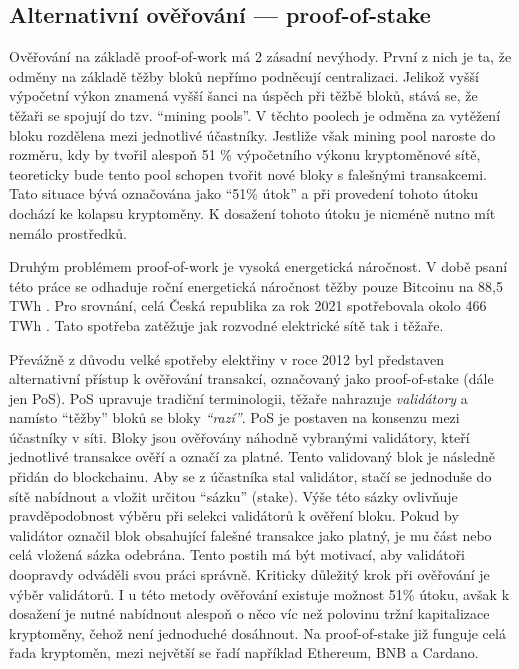 \subsection{Alternativní ověřování --- proof-of-stake}
\label{proof-of-stake-subsection}
Ověřování na základě proof-of-work má 2 zásadní nevýhody. První z nich je ta, že odměny na základě těžby bloků nepřímo podněcují centralizaci.
Jelikož vyšší výpočetní výkon znamená vyšší šanci na úspěch při těžbě bloků, stává se, že těžaři se spojují do tzv. \enquote{mining pools}.
V těchto poolech je odměna za vytěžení bloku rozdělena mezi jednotlivé účastníky. Jestliže však mining pool naroste do rozměru, kdy by tvořil
alespoň 51 \% výpočetního výkonu kryptoměnové sítě, teoreticky bude tento pool schopen tvořit nové bloky s falešnými transakcemi. Tato situace
bývá označována jako \enquote{51\% útok} a při provedení tohoto útoku dochází ke kolapsu kryptoměny. K dosažení tohoto útoku je nicméně
nutno mít nemálo prostředků.

Druhým problémem proof-of-work je vysoká energetická náročnost. V době psaní této práce se odhaduje roční energetická náročnost těžby pouze Bitcoinu
na 88,5 TWh \cite{crypto:energy-consumption-bitcon}. Pro srovnání, celá Česká republika za rok 2021 spotřebovala okolo 466 TWh \cite{crypto:energy-consumption-czechia}.
Tato spotřeba zatěžuje jak rozvodné elektrické sítě tak i těžaře.

Převážně z důvodu velké spotřeby elektřiny v roce 2012 byl představen alternativní přístup k ověřování transakcí, označovaný jako proof-of-stake (dále jen PoS).
PoS upravuje tradiční terminologii, těžaře nahrazuje \emph{validátory} a namísto \enquote{těžby} bloků se bloky \emph{\enquote{razí}}. PoS je
postaven na konsenzu mezi účastníky v síti. Bloky jsou ověřovány náhodně vybranými validátory, kteří jednotlivé transakce ověří a označí za platné.
Tento validovaný blok je následně přidán do blockchainu. Aby se z účastníka stal validátor, stačí se jednoduše do sítě nabídnout a vložit určitou
\enquote{sázku} (stake). Výše této sázky ovlivňuje pravděpodobnost výběru při selekci validátorů k ověření bloku. Pokud by validátor označil
blok obsahující falešné transakce jako platný, je mu část nebo celá vložená sázka odebrána. Tento postih má být motivací, aby validátoři doopravdy
odváděli svou práci správně. Kriticky důležitý krok při ověřování je výběr validátorů. I u této metody ověřování existuje možnost 51\% útoku,
avšak k dosažení je nutné nabídnout alespoň o něco víc než polovinu tržní kapitalizace kryptoměny, čehož není jednoduché dosáhnout.
Na proof-of-stake již funguje celá řada kryptoměn, mezi největší se řadí například Ethereum, BNB a Cardano.


